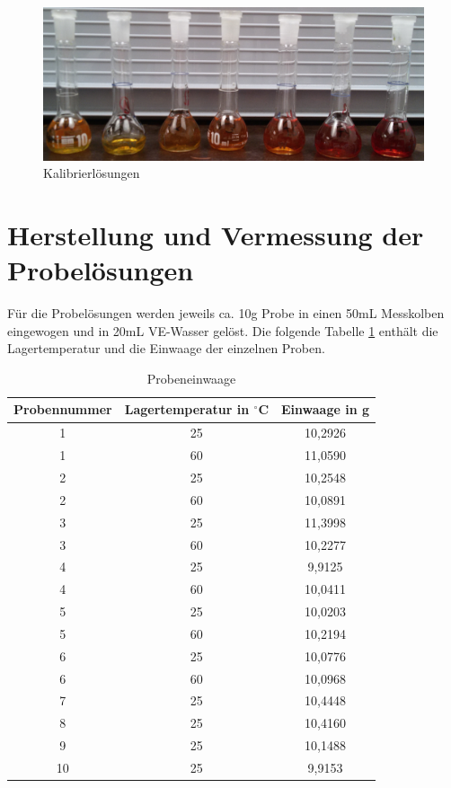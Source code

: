 \begin{figure}[htbp]
    \centering
        \includegraphics[width=1.00\textwidth]{../Bilder/20150424_172612.jpg}
    \caption{Kalibrierlösungen}
    \label{fig:Kalibrierlösungen}
\end{figure}


\section{Herstellung und Vermessung der Probelösungen}

Für die Probelösungen werden jeweils ca. 10g Probe in einen 50mL Messkolben eingewogen und in 20mL VE-Wasser gelöst. Die folgende Tabelle \ref{tab:Probeneinwaage} enthält die Lagertemperatur und die Einwaage der einzelnen Proben. 

\begin{table}[htbp]
    \centering
    \caption{Probeneinwaage}
        \begin{tabular}{c|c|c} 
            Probennummer & Lagertemperatur in $^\circ$C & Einwaage in g\\
            \hline
            1 & 25 & 10,2926\\
            \hline
            1 & 60 & 11,0590\\
            \hline
            2 & 25 & 10,2548\\
            \hline
            2 & 60 & 10,0891\\
            \hline
            3 & 25 & 11,3998\\
            \hline
            3 & 60 & 10,2277\\
            \hline
            4 & 25 & 9,9125\\
            \hline
            4 & 60 & 10,0411\\
            \hline
            5 & 25 & 10,0203\\
            \hline
            5 & 60 & 10,2194\\
            \hline
            6 & 25 & 10,0776\\
            \hline
            6 & 60 & 10,0968\\
            \hline
            7 & 25 & 10,4448\\
            \hline
            8 & 25 & 10,4160\\
            \hline
            9 & 25 & 10,1488\\
            \hline
            10 & 25 & 9,9153\\
        \end{tabular}
    \label{tab:Probeneinwaage}
\end{table}


